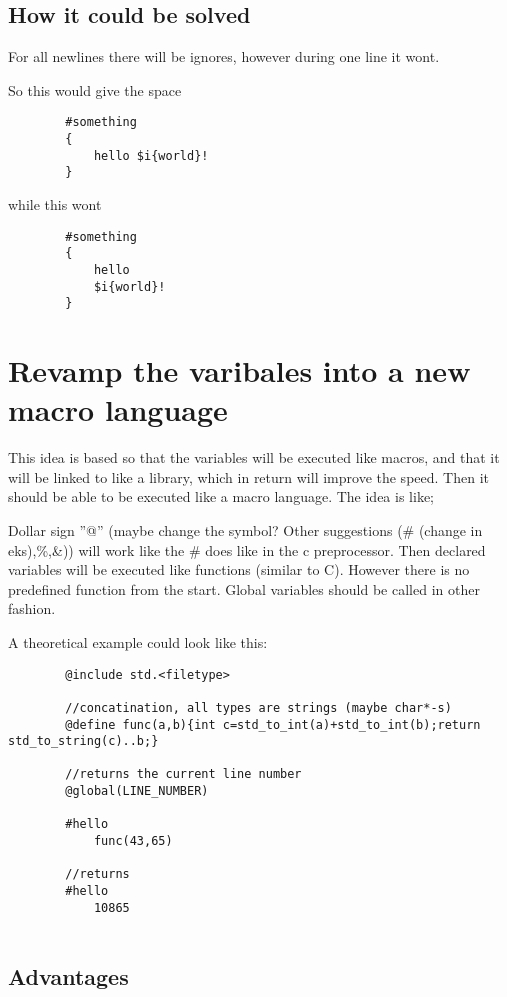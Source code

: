 \documentclass{book}
\begin{document}
	\subsection{How it could be solved}
	
		For all newlines there will be ignores, however during one line it wont.
		
		So this would give the space
		
		\begin{verbatim}
		#something
		{
			hello $i{world}!
		}
		\end{verbatim}
		
		while this wont
		
		\begin{verbatim}
		#something
		{
			hello 
			$i{world}!
		}
		\end{verbatim}
	
	\section{Revamp the varibales into a new macro language}
	
	This idea is based so that the variables will be executed like macros, and that it will be linked to like a library, which in return will improve the speed. 
	Then it should be able to be executed like a macro language.
	The idea is like;
	
	Dollar sign ''@'' (maybe change the symbol? Other suggestions (\# (change in eks),\%,\&)) will work like the \# does like in the c preprocessor. 
	Then declared variables will be executed like functions (similar to C). However there is no predefined function from the start. Global variables should be called in other fashion.
	
	A theoretical example could look like this:
	
	\begin{verbatim}
		@include std.<filetype>
		
		//concatination, all types are strings (maybe char*-s) 
		@define func(a,b){int c=std_to_int(a)+std_to_int(b);return std_to_string(c)..b;}
		
		//returns the current line number
		@global(LINE_NUMBER)
		
		#hello
			func(43,65)
			
		//returns
		#hello
			10865
			
	\end{verbatim}
	
	\subsection{Advantages}
	
\end{document}
